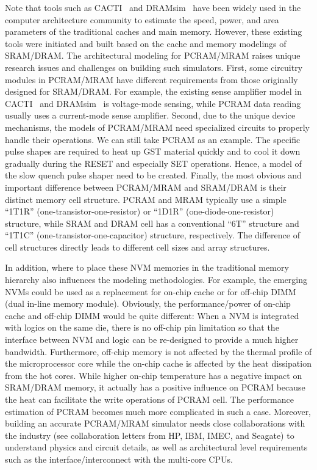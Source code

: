 Note that tools such as CACTI~\cite{CACTI:NORM,PRAM:EVANS,PRAM:eCACTI,PRAM:CACTI60} and DRAMsim~\cite{DRAMsim} have been widely used in the computer architecture community to estimate the speed, power, and area parameters of the traditional caches and main memory. However, these existing tools were initiated and built based on the cache and memory modelings of SRAM/DRAM. The architectural modeling for PCRAM/MRAM raises unique research issues and challenges on building such simulators. First, some circuitry modules in PCRAM/MRAM have different requirements from those originally designed for SRAM/DRAM. For example, the existing sense amplifier model in CACTI~\cite{CACTI:NORM,PRAM:EVANS,PRAM:eCACTI,PRAM:CACTI60} and DRAMsim~\cite{DRAMsim} is voltage-mode sensing, while PCRAM data reading usually uses a current-mode sense amplifier. Second, due to the unique device mechanisms, the models of PCRAM/MRAM need specialized circuits to properly handle their operations. We can still take PCRAM as an example. The specific pulse shapes are required to heat up GST material quickly and to cool it down gradually during the RESET and especially SET operations. Hence, a model of the slow quench pulse shaper need to be created. Finally, the most obvious and important difference between PCRAM/MRAM and SRAM/DRAM is their distinct memory cell structure. PCRAM and MRAM typically use a simple ``1T1R'' (one-transistor-one-resistor) or ``1D1R'' (one-diode-one-resistor) structure, while SRAM and DRAM cell has a conventional ``6T'' structure and ``1T1C'' (one-transistor-one-capacitor) structure, respectively. The difference of cell structures directly leads to different cell sizes and array structures.

In addition, where to place these NVM memories in the traditional memory hierarchy also influences the modeling methodologies. For example, the emerging NVMs could be used as a replacement for on-chip cache or for off-chip DIMM (dual in-line memory module). Obviously, the performance/power of on-chip cache and off-chip DIMM would be quite different: When a NVM is integrated with logics on the same die, there is no off-chip pin limitation so that the interface between NVM and logic can be re-designed to provide a much higher bandwidth. Furthermore, off-chip memory is not affected by the thermal profile of the microprocessor core while the on-chip cache is affected by the heat dissipation from the hot cores. While higher on-chip temperature has a negative impact on SRAM/DRAM memory, it actually has a positive influence on PCRAM because the heat can facilitate the write operations of PCRAM cell. The performance estimation of PCRAM becomes much more complicated in such a case.
Moreover, building an accurate PCRAM/MRAM simulator needs close collaborations with the industry (see collaboration letters from HP, IBM, IMEC, and Seagate) to understand physics and circuit details, as well as architectural level requirements such as the interface/interconnect with the multi-core CPUs.

